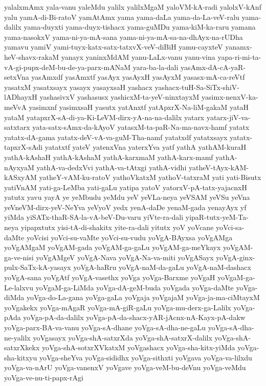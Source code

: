 {yalalxmAmx
yala-vanu
yaleMdu
yalilx
yalilxMgaM
yaloVM-kA-radi
yalolxV-kAnf
yalu
yamA-di-Bi-ratoV
yamAtAmx
yama
yama-daLa
yama-da-La-veV-ralu
yama-dalilx
yama-duyxti
yama-duyx-tishacx
yama-guMDu
yama-kiM-ka-raru
yamana
yama-nasokxV
yama-ni-ya-mA-sana
yama-ni-ya-mA-sa-na-dhAyx-na-rUDha
yamavu
yamiV
yami-tuyx-katx-satx-tatxvX-veV-diBiH
yamu-cayxteV
yanamx-heV-shavx-rakaM
yanayx
yaninxMdAM
yanu-LaLx-vanu
yanu-vina
yapa-ri-mi-ta-vA-gi-pupx-deM-bu-de-ya-parx-mANaM
yara-ba-la-dali
yasAmx-dA-cA-yaR-setxVna
yasAmxdf
yasAmxtf
yasAyx
yasAyxH
yasAyxM
yasasx-mA-ca-reVtf
yasatxM
yasatxsayx
yasayx
yasayxsaH
yashacx
yashacx-tuH-Sa-SiTx-shiV-lADhayxH
yashasivxV
yashasusx
yashicxM-ta-yeV-ninxtayxM
yasimx-nenxV-ka-meVvA
yasimxnf
yasimxsaH
yasutx
yatAnxtf
yatApxrX-Na-liM-gakaM
yataH
yataM
yatapxrX-sA-di-ya-Ki-LeVM-dirx-yA-na-na-dalilx
yatarx
yatarx-jiV-va-satxtarx
yata-satx-sAmx-da-kAyoV
yatasxM-ta-paR-Na-ma-navx-hamf
yatatx
yatatx-dA-gama
yatatx-deV-vA-va-guM-Tha-namf
yatatxdf
yatatxsayx
yatatx-tapxrX-sAdi
yatatxtf
yateV
yatenxVna
yaterxYva
yatf
yathA
yathAM-kuraH
yathA-kAshaH
yathA-kAshaM
yathA-karxmaM
yathA-karx-mamf
yathA-nAyxyaM
yathA-va-dedxVvi
yathA-va-tAtxgi
yathA-vidhi
yatheV-tAyx-kAM-kASxyAM
yatheY-vAM-ku-ratoV
yathoVkatxM
yathoV-tatxraM
yati
yati-Bisutx
yatiVnAM
yati-ga-LeMba
yati-gaLu
yatipa
yatoV
yatorxV-pA-tatx-yajacnxH
yatutx
yavu
yayA
ye
yeMbudu
yeMdu
yeV
yeVLa-neya
yeVSAM
yeVSu
yeVna
yeVneVM-dirx-yeV-NeYva
yeVyoV
yedx
yenA-daDe
yenaM-gada
yenayAyx
yf
yiMda
yiSATx-thaR-SA-la-vA-beV-Du-varu
yiVte-ra-dali
yipaR-tutx-yeM-Ta-neya
yipapxtutx
yisi-tA-di-shakitx
yite-ra-dali
yitutx
yoV
yoVcane
yoVci-sa-daMte
yoVcisi
yoVci-su-vaMte
yoVci-su-vudu
yoVgA-BAyxsa
yoVgAMga
yoVgAMgaM
yoVgAM-gada
yoVgAM-ga-gaLu
yoVgAM-ga-meYkayx
yoVgAM-ga-ve-nisi
yoVgAMgeV
yoVgA-Nava
yoVgA-Na-va-miti
yoVgASayx
yoVgA-ginx-pulx-SaTx-kA-yasayx
yoVgA-haRru
yoVgA-naM-da-gaLu
yoVgA-naM-dashacx
yoVgA-sana
yoVgAtf
yoVgA-vasethx
yoVga
yoVga-Barxme
yoVgaH
yoVgaM-ga-Le-lalxvu
yoVgaM-ga-LiMda
yoVga-dA-geM-buda
yoVgada
yoVga-daMte
yoVga-diMda
yoVga-do-La-gana
yoVga-gaLa
yoVgaja
yoVgajaM
yoVga-ja-ma-ciMtayxM
yoVgakekx
yoVga-mAgaR
yoVga-mA-giR-gaLu
yoVga-mu-derx-ga-Lalilx
yoVga-pAda
yoVga-pA-da-dalilx
yoVga-pA-da-shacx-yAR-jAcnx-nA-Kayx-pA-dakw
yoVga-parx-BA-va-vanu
yoVga-sA-dhane
yoVga-sA-dha-ne-gaLu
yoVga-sA-dha-ne-yalilx
yoVgasayx
yoVga-shA-satxrXda
yoVga-shA-satxrX-dalilx
yoVga-shA-satxrXkekx
yoVga-shA-sotxrXVkatxM
yoVgashacx
yoVga-sha-kitx-yiMda
yoVga-sha-kitxyu
yoVga-sheYva
yoVga-sididhx
yoVga-sithxti
yoVgava
yoVga-va-lilxdu
yoVga-va-nArU
yoVga-vanenxV
yoVgave
yoVga-veM-bu-deVnu
yoVga-veMdu
yoVga-ve-nu-ti-papx-rAgi
}
